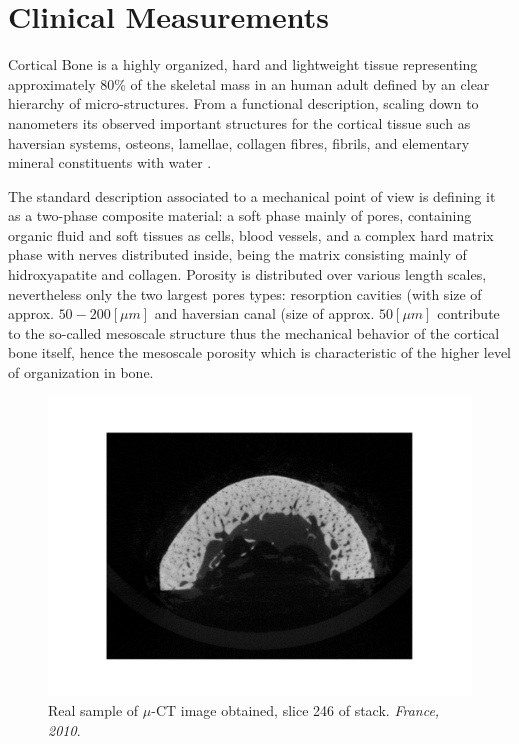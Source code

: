 \chapter{Clinical Measurements}
Cortical Bone is a highly organized, hard and lightweight tissue representing approximately 80\% of the skeletal mass in an human adult defined by an clear hierarchy of micro-structures. From a functional description, scaling down to nanometers its observed important structures for the cortical tissue such as haversian systems, osteons, lamellae, collagen fibres, fibrils, and elementary mineral constituents with water \cite{Parnell2008}.

The standard description associated to a mechanical point of view is defining it as a two-phase composite material: a soft phase mainly of pores, containing organic fluid and soft tissues as cells, blood vessels, and a complex hard matrix phase with nerves distributed inside, being the matrix consisting mainly of hidroxyapatite and collagen. Porosity is distributed over various length scales, nevertheless only the two largest pores types: resorption cavities (with size of approx. $50-200 [\mu m]$ and haversian canal (size of approx. $50 [ \mu m ]$ contribute to the so-called mesoscale structure thus the mechanical behavior of the cortical bone itself, hence the mesoscale porosity which is characteristic of the higher level of organization in bone. 

\begin{figure}[!h]
	\centering
	\includegraphics[scale=.5]{images/ImgExt/246-2010_rec0964.pdf}
	\caption{Real sample of $\mu$-CT image obtained, slice 246 of stack. \textit{France, 2010}.}
	\label{muCT-Image}
\end{figure}

